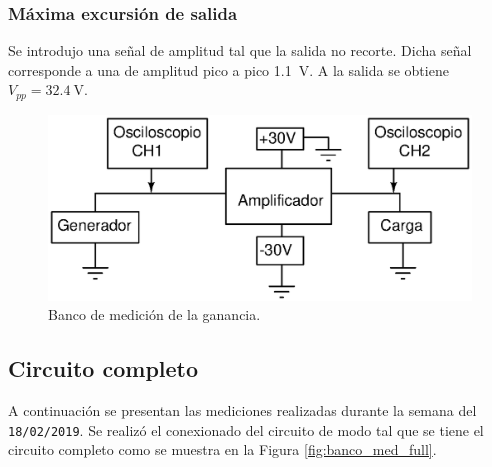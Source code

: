 
		\subsubsection{Máxima excursión de salida}
			
		Se introdujo una señal de amplitud tal que la salida no recorte. Dicha señal corresponde a una de amplitud pico a pico \SI{1.1}{\V}. A la salida se obtiene $V_{pp} = \SI{32.4}{\V}$.

		\begin{figure}[h!]
			\centering
			\includegraphics[scale=0.6]{./Figuras/bco_ganancia.eps}
			\caption{Banco de medición de la ganancia.}
			\label{fig:bco_ganancia}
		\end{figure}


		\subsection{Circuito completo}
		A continuación se presentan las mediciones realizadas durante la semana del \texttt{18/02/2019}. Se realizó el conexionado del circuito de modo tal que se tiene el circuito completo como se muestra en la Figura \ref{fig:banco_med_full}. 



